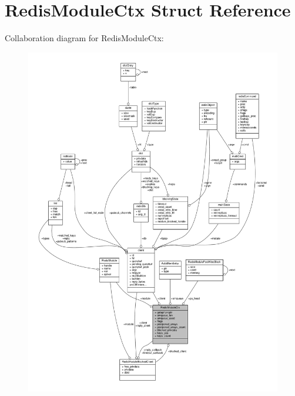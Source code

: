 \hypertarget{structRedisModuleCtx}{}\section{Redis\+Module\+Ctx Struct Reference}
\label{structRedisModuleCtx}


Collaboration diagram for Redis\+Module\+Ctx\+:\nopagebreak
\begin{figure}[H]
\begin{center}
\leavevmode
\includegraphics[width=350pt]{structRedisModuleCtx__coll__graph}
\end{center}
\end{figure}
